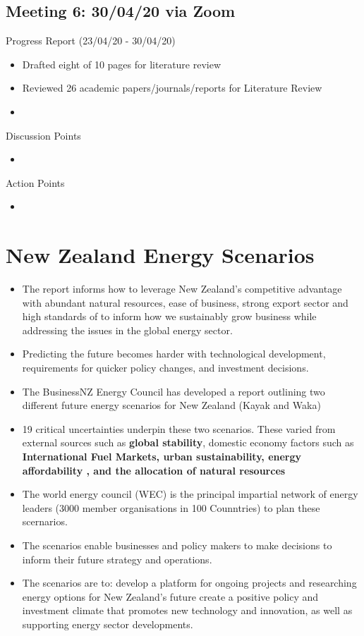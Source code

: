 \documentclass[12pt]{article}
\begin{document}
    \subsection{Meeting 6: 30/04/20 via Zoom}
Progress Report (23/04/20 - 30/04/20)
\begin{itemize}
    \item Drafted eight of 10 pages for literature review
    \item Reviewed 26 academic papers/journals/reports for Literature Review
    \item 
\end{itemize}
Discussion Points
    \begin{itemize}
        \item 
    \end{itemize}
Action Points
    \begin{itemize}
        \item 
    \end{itemize}






    \section{New Zealand Energy Scenarios}
    \begin{itemize}
        \item   The report informs how to leverage New Zealand's competitive advantage
                with abundant natural resources, ease of business, strong export sector
                and high standards of to inform how we sustainably grow business while
                addressing the issues in the global energy sector.
        \item   Predicting the future becomes harder with technological development,
                requirements for quicker policy changes, and investment decisions.
        \item   The BusinessNZ Energy Council has developed a report outlining two different
                future energy scenarios for New Zealand (Kayak and Waka)
        \item   19 critical uncertainties underpin these two scenarios. These varied from 
                external sources such as \textbf{global stability}, domestic economy factors
                such as \textbf{International Fuel Markets, urban sustainability, energy affordability
                , and the allocation of natural resources} 
        \item   The world energy council (WEC) is the principal impartial network of energy
                leaders (3000 member organisations in 100 Counntries) to plan these scernarios.
        \item   The scenarios enable businesses and policy makers to make decisions to inform
                their future strategy and operations.
        \item   The scenarios are to: develop a platform for ongoing projects and researching 
                energy options for New Zealand’s future create a positive policy and investment 
                climate that promotes new technology and innovation, as well as supporting energy 
                sector developments.
    \end{itemize}
\end{document}
